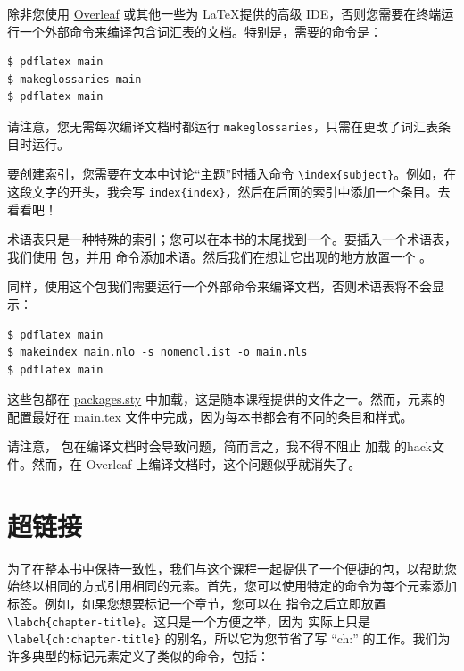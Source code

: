除非您使用 \href{https://www.overleaf.com}{Overleaf} 或其他一些为 \LaTeX 提供的高级 IDE，否则您需要在终端运行一个外部命令来编译包含词汇表的文档。特别是，需要的命令是：

\begin{lstlisting}[style=kaolstplain]
$ pdflatex main
$ makeglossaries main
$ pdflatex main
\end{lstlisting}

请注意，您无需每次编译文档时都运行 \texttt{makeglossaries}，只需在更改了词汇表条目时运行。

要创建索引，您需要在文本中讨论“主题”时插入命令 \lstinline|\index{subject}|。例如，在这段文字的开头，我会写 \lstinline|index{index}|，然后在后面的索引中添加一个条目。去看看吧！


术语表只是一种特殊的索引；您可以在本书的末尾找到一个。要插入一个术语表，我们使用  包，并用  命令添加术语。然后我们在想让它出现的地方放置一个 。

同样，使用这个包我们需要运行一个外部命令来编译文档，否则术语表将不会显示：

\begin{lstlisting}[style=kaolstplain]
$ pdflatex main
$ makeindex main.nlo -s nomencl.ist -o main.nls
$ pdflatex main
\end{lstlisting}

这些包都在 \href{style/packages.sty}{packages.sty} 中加载，这是随本课程提供的文件之一。然而，元素的配置最好在 main.tex 文件中完成，因为每本书都会有不同的条目和样式。

请注意， 包在编译文档时会导致问题，简而言之，我不得不阻止  加载  的hack文件。然而，在 Overleaf 上编译文档时，这个问题似乎就消失了。


\section{超链接}

为了在整本书中保持一致性，我们与这个课程一起提供了一个便捷的包，以帮助您始终以相同的方式引用相同的元素。首先，您可以使用特定的命令为每个元素添加标签。例如，如果您想要标记一个章节，您可以在  指令之后立即放置 \lstinline|\labch{chapter-title}|。这只是一个方便之举，因为  实际上只是 \lstinline|\label{ch:chapter-title}| 的别名，所以它为您节省了写 \enquote{ch:} 的工作。我们为许多典型的标记元素定义了类似的命令，包括：


